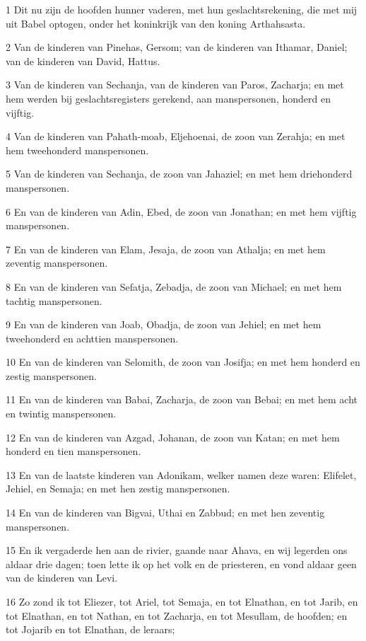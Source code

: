 \par 1 Dit nu zijn de hoofden hunner vaderen, met hun geslachtsrekening, die met mij uit Babel optogen, onder het koninkrijk van den koning Arthahsasta.
\par 2 Van de kinderen van Pinehas, Gersom; van de kinderen van Ithamar, Daniel; van de kinderen van David, Hattus.
\par 3 Van de kinderen van Sechanja, van de kinderen van Paros, Zacharja; en met hem werden bij geslachtsregisters gerekend, aan manspersonen, honderd en vijftig.
\par 4 Van de kinderen van Pahath-moab, Eljehoenai, de zoon van Zerahja; en met hem tweehonderd manspersonen.
\par 5 Van de kinderen van Sechanja, de zoon van Jahaziel; en met hem driehonderd manspersonen.
\par 6 En van de kinderen van Adin, Ebed, de zoon van Jonathan; en met hem vijftig manspersonen.
\par 7 En van de kinderen van Elam, Jesaja, de zoon van Athalja; en met hem zeventig manspersonen.
\par 8 En van de kinderen van Sefatja, Zebadja, de zoon van Michael; en met hem tachtig manspersonen.
\par 9 En van de kinderen van Joab, Obadja, de zoon van Jehiel; en met hem tweehonderd en achttien manspersonen.
\par 10 En van de kinderen van Selomith, de zoon van Josifja; en met hem honderd en zestig manspersonen.
\par 11 En van de kinderen van Babai, Zacharja, de zoon van Bebai; en met hem acht en twintig manspersonen.
\par 12 En van de kinderen van Azgad, Johanan, de zoon van Katan; en met hem honderd en tien manspersonen.
\par 13 En van de laatste kinderen van Adonikam, welker namen deze waren: Elifelet, Jehiel, en Semaja; en met hen zestig manspersonen.
\par 14 En van de kinderen van Bigvai, Uthai en Zabbud; en met hen zeventig manspersonen.
\par 15 En ik vergaderde hen aan de rivier, gaande naar Ahava, en wij legerden ons aldaar drie dagen; toen lette ik op het volk en de priesteren, en vond aldaar geen van de kinderen van Levi.
\par 16 Zo zond ik tot Eliezer, tot Ariel, tot Semaja, en tot Elnathan, en tot Jarib, en tot Elnathan, en tot Nathan, en tot Zacharja, en tot Mesullam, de hoofden; en tot Jojarib en tot Elnathan, de leraars;
